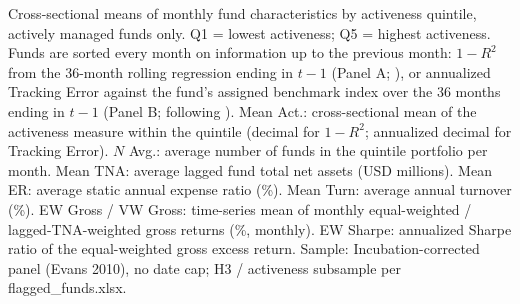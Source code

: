 \begin{table}[!htbp]
\begin{minipage}{\tabletempwidth}
\begin{singlespace}
Cross-sectional means of monthly fund characteristics by activeness quintile, actively managed funds only. Q1 = lowest activeness; Q5 = highest activeness. Funds are sorted every month on information up to the previous month: $1-R^2$ from the 36-month rolling \textcite{Carhart1997} regression ending in $t-1$ (Panel A; \citealt{AmihudGoyenko2013}), or annualized Tracking Error against the fund's assigned benchmark index over the 36 months ending in $t-1$ (Panel B; following \citealt{CremersPetajisto2009}). Mean Act.: cross-sectional mean of the activeness measure within the quintile (decimal for $1-R^2$; annualized decimal for Tracking Error). $N$ Avg.: average number of funds in the quintile portfolio per month. Mean TNA: average lagged fund total net assets (USD millions). Mean ER: average static annual expense ratio (\%). Mean Turn: average annual turnover (\%). EW Gross / VW Gross: time-series mean of monthly equal-weighted / lagged-TNA-weighted gross returns (\%, monthly). EW Sharpe: annualized Sharpe ratio of the equal-weighted gross excess return. Sample: Incubation-corrected panel (Evans 2010), no date cap; H3 / activeness subsample per flagged\_funds.xlsx.
\end{singlespace}
\end{minipage}
\end{table}

